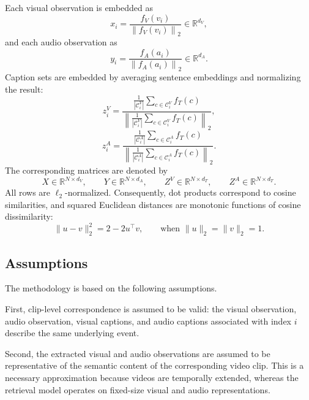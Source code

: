 Each visual observation is embedded as
\begin{equation}
    x_i =
    \frac{f_V(v_i)}
    {\left\| f_V(v_i) \right\|_2}
    \in \mathbb{R}^{d_V},
\end{equation}
and each audio observation as
\begin{equation}
    y_i =
    \frac{f_A(a_i)}
    {\left\| f_A(a_i) \right\|_2}
    \in \mathbb{R}^{d_A}.
\end{equation}
Caption sets are embedded by averaging sentence embeddings and normalizing the result:
\begin{equation}
    z_i^V =
    \frac{
    \frac{1}{|\mathcal{C}^{V}_i|}
    \sum_{c \in \mathcal{C}^{V}_i} f_T(c)
    }
    {
    \left\|
    \frac{1}{|\mathcal{C}^{V}_i|}
    \sum_{c \in \mathcal{C}^{V}_i} f_T(c)
    \right\|_2
    },
\end{equation}
\begin{equation}
    z_i^A =
    \frac{
    \frac{1}{|\mathcal{C}^{A}_i|}
    \sum_{c \in \mathcal{C}^{A}_i} f_T(c)
    }
    {
    \left\|
    \frac{1}{|\mathcal{C}^{A}_i|}
    \sum_{c \in \mathcal{C}^{A}_i} f_T(c)
    \right\|_2
    }.
\end{equation}
The corresponding matrices are denoted by
\[
    X \in \mathbb{R}^{N \times d_V},
    \qquad
    Y \in \mathbb{R}^{N \times d_A},
    \qquad
    Z^V \in \mathbb{R}^{N \times d_T},
    \qquad
    Z^A \in \mathbb{R}^{N \times d_T}.
\]
All rows are $\ell_2$-normalized. Consequently, dot products correspond to cosine similarities, and squared Euclidean distances are monotonic functions of cosine dissimilarity:
\begin{equation}
    \|u-v\|_2^2 = 2 - 2u^{\top}v,
    \qquad
    \text{when }
    \|u\|_2=\|v\|_2=1.
\end{equation}

\subsection{Assumptions}
\label{subsec:assumptions}

The methodology is based on the following assumptions.

First, clip-level correspondence is assumed to be valid: the visual observation, audio observation, visual captions, and audio captions associated with index $i$ describe the same underlying event.

Second, the extracted visual and audio observations are assumed to be representative of the semantic content of the corresponding video clip. This is a necessary approximation because videos are temporally extended, whereas the retrieval model operates on fixed-size visual and audio representations.

